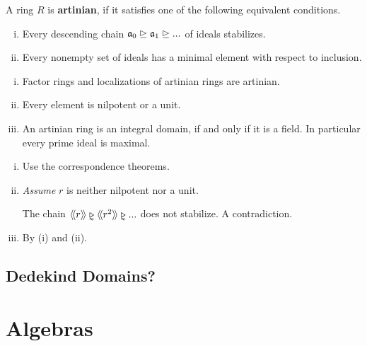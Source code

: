 	\begin{definition}
		A ring $R$ is \textbf{artinian}, if it satisfies one of the following equivalent conditions.
		\begin{enumerate}[(i)]
			\item{
				Every descending chain $\mathfrak{a}_0 \trianglerighteq \mathfrak{a}_1 \trianglerighteq ...$ of ideals stabilizes.
			}
			\item{
				Every nonempty set of ideals has a minimal element with respect to inclusion.
			}
		\end{enumerate}
	\end{definition}

	\begin{lemma}\vspace{-1.5em}
		\begin{enumerate}[(i)]
			\item{
				Factor rings and localizations of artinian rings are artinian.
			}
			\item{
				Every element is nilpotent or a unit.
			}
			\item{
				An artinian ring is an integral domain, if and only if it is a field. In particular every prime ideal is maximal.
			}
		\end{enumerate}
	\end{lemma}
	\begin{sketch}
		\begin{enumerate}[(i)]
			\item{
				Use the correspondence theorems.
			}
			\item{
				\textit{Assume} $r$ is neither nilpotent nor a unit.
				\begin{tab}[1.3cm]
					The chain $\Gen{r} \vidneq \Gen{r^2} \vidneq ...$ does not stabilize. A contradiction.
				\end{tab}
			}
			\item{
				By (i) and (ii).
			}\vspace{-1.8em}
		\end{enumerate}
	\end{sketch}


	\subsection{Dedekind Domains?}


	\newpage
	\section{Algebras}

